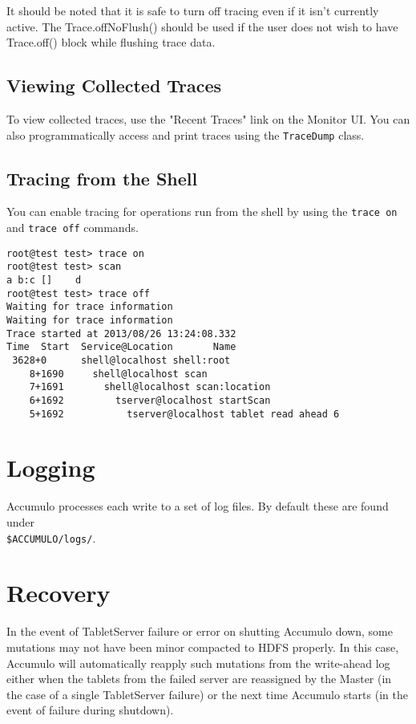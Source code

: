 It should be noted that it is safe to turn off tracing even if it
isn't currently active. The Trace.offNoFlush() should be used if the
user does not wish to have Trace.off() block while flushing trace
data.

\subsection{Viewing Collected Traces}
To view collected traces, use the "Recent Traces" link on the Monitor
UI. You can also programmatically access and print traces using the
\texttt{TraceDump} class.

\subsection{Tracing from the Shell}
You can enable tracing for operations run from the shell by using the
\texttt{trace on} and \texttt{trace off} commands.

\begingroup\fontsize{8pt}{8pt}\selectfont\begin{verbatim}
root@test test> trace on
root@test test> scan
a b:c []    d
root@test test> trace off
Waiting for trace information
Waiting for trace information
Trace started at 2013/08/26 13:24:08.332
Time  Start  Service@Location       Name
 3628+0      shell@localhost shell:root
    8+1690     shell@localhost scan
    7+1691       shell@localhost scan:location
    6+1692         tserver@localhost startScan
    5+1692           tserver@localhost tablet read ahead 6
\end{verbatim}\endgroup

\section{Logging}
Accumulo processes each write to a set of log files. By default these are found under\\
\texttt{\$ACCUMULO/logs/}.

\section{Recovery}

In the event of TabletServer failure or error on shutting Accumulo down, some
mutations may not have been minor compacted to HDFS properly. In this case,
Accumulo will automatically reapply such mutations from the write-ahead log
either when the tablets from the failed server are reassigned by the Master (in the
case of a single TabletServer failure) or the next time Accumulo starts (in the event of
failure during shutdown).

